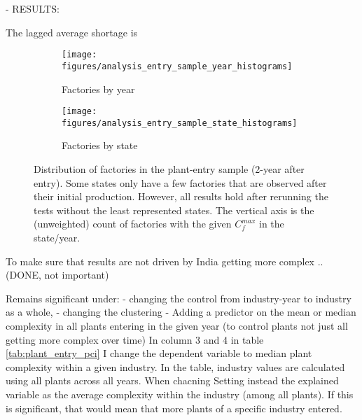 \documentclass[11pt]{article}
\begin{document}
- RESULTS:

The lagged average shortage is 

\begin{figure}
     \centering
     \begin{subfigure}[b]{0.45\textwidth}
         \centering
         \texttt{[image: figures/analysis\_entry\_sample\_year\_histograms]}
	 \caption{Factories by year}
         \label{fig:entry_by_year}
     \end{subfigure}
     \hfill
     \begin{subfigure}[b]{0.45\textwidth}
         \centering
         \texttt{[image: figures/analysis\_entry\_sample\_state\_histograms]}
	 \caption{Factories by state}
         \label{fig:entry_by_state}
     \end{subfigure}
     \caption{Distribution of factories in the plant-entry sample (2-year after entry). Some states only have a few factories that are observed after their initial production. However, all results hold after rerunning the tests without the least represented states. The vertical axis is the (unweighted) count of factories with the given $C^{max}_{f}$ in the state/year.}
        \label{fig:new_entry_sample}
\end{figure}

To make sure that results are not driven by India getting more complex .. (DONE, not important)


%			



Remains significant under: 
 - changing the control from industry-year to industry as a whole,
 - changing the clustering
 - Adding a predictor on the mean or median complexity in all plants entering in the given year (to control plants not just all getting more complex over time)
In column 3 and 4 in table \ref{tab:plant_entry_pci} I change the dependent variable to median plant complexity within a given industry. In the table, industry values are calculated using all plants across all years. When chacning 
Setting instead the explained variable as the average complexity within the industry (among all plants). If this is significant, that would mean that more plants of a specific industry entered.
\end{document}
